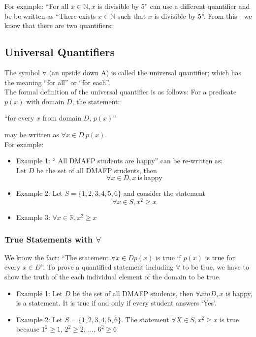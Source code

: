 For example: ``For all $x \in \mathbb{N}, x$ is divisible by 5'' can use a different quantifier and be be written as ``There exists $x \in \mathbb{N}$ such that $x$ is divisible by 5''. From this  - we know that there are two quantifiers:
\subsection{Universal Quantifiers}
The symbol $\forall$ (an upside down A) is called the universal quantifier; which has the meaning ``for all'' or ``for each''.\\

The formal definition of the universal quantifier is as follows: For a predicate $p(x)$ with domain $D$, the statement:
\begin{center}
    ``for every $x$ from domain $D$, $p(x)$''
\end{center}
may be written as $\forall x \in D\  p(x)$.\\

For example:
\begin{itemize}
    \item Example 1: `` All DMAFP students are happy'' can be re-written as:\\
    Let $D$ be the set of all DMAFP students, then
    \[\forall x \in D, x \mathrm{\ is\ happy}\]
    \item Example 2: Let $S = \{1, 2, 3, 4, 5, 6 \}$ and consider the statement
    \[\forall x \in S, x^2 \geq x\]
    \item Example 3: $\forall x \in \mathbb{R}, x^2 \geq x$
\end{itemize}

\subsubsection{True Statements with $\forall$}
We know the fact: ``The statement $\forall x \in D p(x)$ is true if $p(x)$ is true for every $x \in D$''. To prove a quantified statement including $\forall$ to be true, we have to show the truth of the each individual element of the domain to be true.
\begin{itemize}
    \item Example 1: Let $D$ be the set of all DMAFP students, then $\forall x in D, x$ is happy, is a statement. It is true if and only if every student answers `Yes'. 
    \item Example 2: Let $S = \{1, 2, 3, 4, 5, 6 \}$. The statement $\forall X \in S, x^2 \geq x$ is true because $1^2 \geq 1$, $2^2 \geq 2$, $\ldots$,  $6^2 \geq 6$
\end{itemize}


